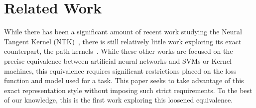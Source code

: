 

\section{Related Work}
While there has been a significant amount of recent work studying the Neural Tangent Kernel (NTK)~\citep{jacot2018neural}, there is still relatively little work exploring its exact counterpart, the path kernels~\citep{bell2023, chen2021equivalence, domingos2020}. While these other works are focused on the precise equivalence between artificial neural networks and SVMs or Kernel machines, this equivalence requires significant restrictions placed on the loss function and model used for a task. This paper seeks to take advantage of this exact representation style without imposing such strict requirements. To the best of our knowledge, this is the first work exploring this loosened equivalence. 

